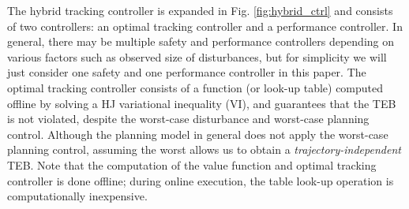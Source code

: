 


The hybrid tracking controller is expanded in Fig. \ref{fig:hybrid_ctrl} and consists of two controllers: an optimal tracking controller and a performance controller.
In general, there may be multiple safety and performance controllers depending on various factors such as observed size of disturbances, but for simplicity we will just consider one safety and one performance controller in this paper. 
The optimal tracking controller consists of a function (or look-up table) computed offline by solving a HJ variational inequality (VI), and guarantees that the TEB is not violated, despite the worst-case disturbance and worst-case planning control. 
Although the planning model in general does not apply the worst-case planning control, assuming the worst allows us to obtain a \textit{trajectory-independent} TEB.
Note that the computation of the value function and optimal tracking controller is done offline; during online execution, the table look-up operation is computationally inexpensive. 

